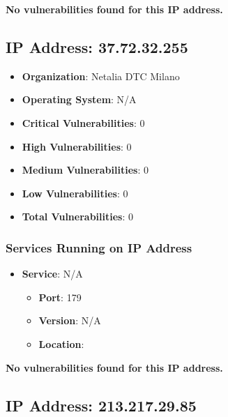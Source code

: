 \documentclass{article}
\begin{document}
\textbf{No vulnerabilities found for this IP address.}




\clearpage



\subsection*{IP Address: 37.72.32.255}

\begin{itemize}
    \item \textbf{Organization}: Netalia DTC Milano
    \item \textbf{Operating System}:  N/A 
    \item \textbf{Critical Vulnerabilities}: 0
    \item \textbf{High Vulnerabilities}: 0
    \item \textbf{Medium Vulnerabilities}: 0
    \item \textbf{Low Vulnerabilities}: 0
    \item \textbf{Total Vulnerabilities}: 0
\end{itemize}

\subsubsection*{Services Running on IP Address}

\begin{itemize}
    
        \item \textbf{Service}: N/A
        \begin{itemize}
            \item \textbf{Port}: 179
            \item \textbf{Version}:  N/A 
            \item \textbf{Location}: \href{  }{  }
        \end{itemize}
    
\end{itemize}


\textbf{No vulnerabilities found for this IP address.}




\clearpage



\subsection*{IP Address: 213.217.29.85}
\end{document}
